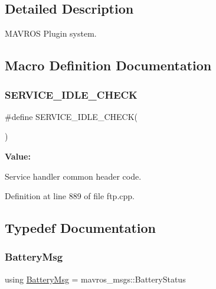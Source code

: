 \subsection{Detailed Description}
M\+A\+V\+R\+OS Plugin system. 



\subsection{Macro Definition Documentation}
\mbox{\label{group__plugin_ga75baa5fe36b24b82bf055d7ded996c07}} 
\subsubsection{\texorpdfstring{SERVICE\_IDLE\_CHECK}{SERVICE\_IDLE\_CHECK}}
{\footnotesize\ttfamily \#define S\+E\+R\+V\+I\+C\+E\+\_\+\+I\+D\+L\+E\+\_\+\+C\+H\+E\+CK(\begin{DoxyParamCaption}{ }\end{DoxyParamCaption})}

{\bfseries Value\+:}
\begin{DoxyCode}{0}
\DoxyCodeLine{    \}}

\end{DoxyCode}
Service handler common header code. 

Definition at line 889 of file ftp.\+cpp.



\subsection{Typedef Documentation}
\mbox{\label{group__plugin_gaa1fcc4bfa5eda09f217448b6d2d373fa}} 
\subsubsection{\texorpdfstring{BatteryMsg}{BatteryMsg}}
{\footnotesize\ttfamily using \mbox{\hyperlink{group__plugin_gaa1fcc4bfa5eda09f217448b6d2d373fa}{Battery\+Msg}} =  mavros\+\_\+msgs\+::\+Battery\+Status}



